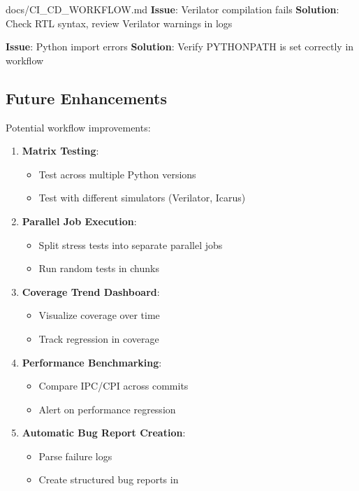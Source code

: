 \begin{relocated}{docs/CI_CD_WORKFLOW.md}
\textbf{Issue}: Verilator compilation fails \textbf{Solution}: Check RTL
syntax, review Verilator warnings in logs

\textbf{Issue}: Python import errors \textbf{Solution}: Verify
PYTHONPATH is set correctly in workflow

\subsection{Future Enhancements}\label{um:flow:ci-cd-workflow:future-enhancements}

Potential workflow improvements:

\begin{enumerate}
\def\labelenumi{\arabic{enumi}.}
\item
  \textbf{Matrix Testing}:

  \begin{itemize}
  \tightlist
  \item
    Test across multiple Python versions
  \item
    Test with different simulators (Verilator, Icarus)
  \end{itemize}
\item
  \textbf{Parallel Job Execution}:

  \begin{itemize}
  \tightlist
  \item
    Split stress tests into separate parallel jobs
  \item
    Run random tests in chunks
  \end{itemize}
\item
  \textbf{Coverage Trend Dashboard}:

  \begin{itemize}
  \tightlist
  \item
    Visualize coverage over time
  \item
    Track regression in coverage
  \end{itemize}
\item
  \textbf{Performance Benchmarking}:

  \begin{itemize}
  \tightlist
  \item
    Compare IPC/CPI across commits
  \item
    Alert on performance regression
  \end{itemize}
\item
  \textbf{Automatic Bug Report Creation}:

  \begin{itemize}
  \tightlist
  \item
    Parse failure logs
  \item
    Create structured bug reports in 
  \end{itemize}
\end{enumerate}


\end{relocated}
